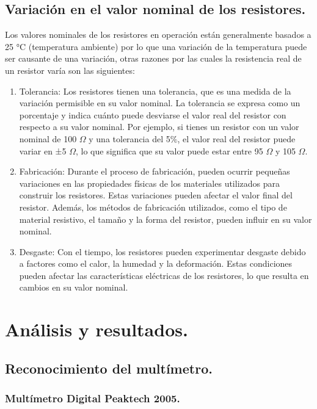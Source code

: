 \documentclass[10pt]{article}
\begin{document}
\begin{multicols}{2}
\subsection{Variación en el valor nominal de los resistores.}

Los valores nominales de los resistores en operación están generalmente basados a 25 °C (temperatura ambiente) por lo que una variación de la temperatura puede ser causante de una variación, otras razones por las cuales la resistencia real de un resistor varía son las siguientes:
\begin{enumerate}
	\item Tolerancia: Los resistores tienen una tolerancia, que es una medida de la variación permisible en su valor nominal. La tolerancia se expresa como un porcentaje y indica cuánto puede desviarse el valor real del resistor con respecto a su valor nominal. Por ejemplo, si tienes un resistor con un valor nominal de 100 $\Omega$ y una tolerancia del 5$\%$, el valor real del resistor puede variar en ±5 $\Omega$, lo que significa que su valor puede estar entre 95 $\Omega$ y 105 $\Omega$.
	\item Fabricación: Durante el proceso de fabricación, pueden ocurrir pequeñas variaciones en las propiedades físicas de los materiales utilizados para construir los resistores. Estas variaciones pueden afectar el valor final del resistor. Además, los métodos de fabricación utilizados, como el tipo de material resistivo, el tamaño y la forma del resistor, pueden influir en su valor nominal.
	\item Desgaste: Con el tiempo, los resistores pueden experimentar desgaste debido a factores como el calor, la humedad y la deformación. Estas condiciones pueden afectar las características eléctricas de los resistores, lo que resulta en cambios en su valor nominal.
\end{enumerate}


\section{Análisis y resultados.}

\subsection{Reconocimiento del multímetro.}
 

\subsubsection{Multímetro Digital Peaktech 2005.}


\end{multicols}
\end{document}
